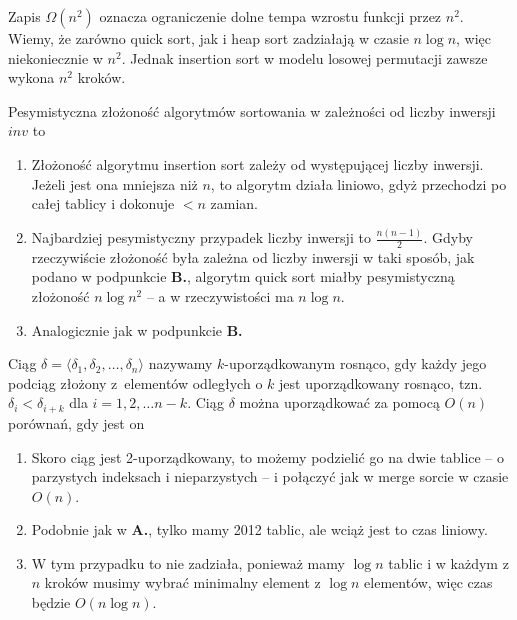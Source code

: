 \begin{solutions}
    Zapis $\Omega(n^2)$ oznacza ograniczenie dolne tempa wzrostu funkcji przez $n^2$. Wiemy, że zarówno quick sort, jak i heap sort zadziałają w czasie $n\log{n}$, więc niekoniecznie w $n^2$. Jednak insertion sort w modelu losowej permutacji zawsze wykona $n^2$ kroków.

    \sol Pesymistyczna złożoność algorytmów sortowania w zależności od liczby inwersji $inv$ to

    \begin{enumerate}[\bf A.]
        \item Złożoność algorytmu insertion sort zależy od występującej liczby inwersji. Jeżeli jest ona mniejsza niż $n$, to algorytm działa liniowo, gdyż przechodzi po całej tablicy i dokonuje $<n$ zamian.

        \item Najbardziej pesymistyczny przypadek liczby inwersji to $\frac{n(n-1)}{2}$. Gdyby rzeczywiście złożoność była zależna od liczby inwersji w taki sposób, jak podano w podpunkcie \textbf{B.}, algorytm quick sort miałby pesymistyczną złożoność $n\log n^2$ -- a w rzeczywistości ma $n \log n$.

        \item Analogicznie jak w podpunkcie \textbf{B.}
    \end{enumerate}
    
    \sol Ciąg $\delta=\langle\delta_1,\delta_2,\ldots,\delta_n\rangle$ nazywamy $k$-uporządkowanym rosnąco, gdy każdy jego podciąg złożony z~elementów odległych o $k$ jest uporządkowany rosnąco, tzn. $\delta_i<\delta_{i+k}$ dla $i=1,2,\ldots n-k$. Ciąg $\delta$ można uporządkować za pomocą $O(n)$ porównań, gdy jest on

    \begin{enumerate}
        \item Skoro ciąg jest 2-uporządkowany, to możemy podzielić go na dwie tablice -- o parzystych indeksach i nieparzystych -- i połączyć jak w merge sorcie w czasie $O(n)$.

        \item Podobnie jak w \textbf{A.}, tylko mamy 2012 tablic, ale wciąż jest to czas liniowy.

        \item W tym przypadku to nie zadziała, ponieważ mamy $\log{n}$ tablic i w każdym z $n$ kroków musimy wybrać minimalny element z $\log{n}$ elementów, więc czas będzie $O(n\log{n})$.
    \end{enumerate}


\end{solutions}
